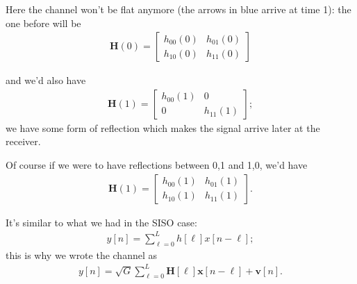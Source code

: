 \documentclass[a4paper, 12pt]{book}
\begin{document}
\begin{tcolorbox}[colframe=cyan!80!blue, colback=white, sharp corners, boxrule=1pt]
\begin{center}
\end{center}

Here the channel won't be flat anymore (the arrows in blue arrive at time 1): the one before will be
\begin{align*}
    \boldsymbol{H}(0) = \begin{bmatrix} h_{00}(0) & h_{01}(0) \\ h_{10}(0) & h_{11}(0) \end{bmatrix}
\end{align*}

and we'd also have
\begin{align*}
    \boldsymbol{H}(1) = \begin{bmatrix} h_{00}(1) & 0 \\ 0 & h_{11}(1) \end{bmatrix};
\end{align*}
we have some form of reflection which makes the signal arrive later at the receiver.
\end{tcolorbox}

\begin{tcolorbox}[colframe=cyan!80!blue, colback=white, sharp corners, boxrule=1pt]
Of course if we were to have reflections between 0,1 and 1,0, we'd have
\begin{align*}
    \boldsymbol{H}(1) = \begin{bmatrix} h_{00}(1) & h_{01}(1) \\ h_{10}(1) & h_{11}(1) \end{bmatrix}.
\end{align*}
\end{tcolorbox}
It's similar to what we had in the SISO case:
\begin{align}
y[n] = \sum_{\ell=0}^{L} h[\ell]x[n-\ell];
\end{align}
this is why we wrote the channel as
\begin{align}
y[n] = \sqrt{G} \sum_{\ell=0}^{L} \boldsymbol{H}[\ell]\boldsymbol{x}[n-\ell] + \boldsymbol{v}[n].
\end{align}
\end{document}
